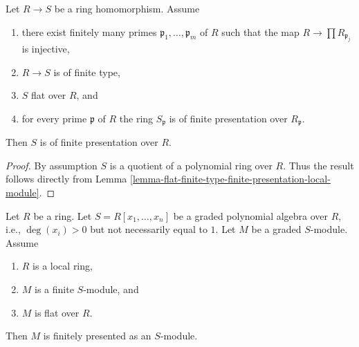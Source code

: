 \begin{lemma}
\label{lemma-flat-finite-type-finite-presentation-local}
Let $R \to S$ be a ring homomorphism.
Assume
\begin{enumerate}
\item there exist finitely many primes
$\mathfrak p_1, \ldots, \mathfrak p_m$ of $R$ such that
the map $R \to \prod R_{\mathfrak p_j}$ is injective,
\item $R \to S$ is of finite type,
\item $S$ flat over $R$, and
\item for every prime $\mathfrak p$ of $R$ the ring $S_{\mathfrak p}$
is of finite presentation over $R_{\mathfrak p}$.
\end{enumerate}
Then $S$ is of finite presentation over $R$.
\end{lemma}

\begin{proof}
By assumption $S$ is a quotient of a polynomial ring over $R$.
Thus the result follows directly from
Lemma \ref{lemma-flat-finite-type-finite-presentation-local-module}.
\end{proof}

\begin{lemma}
\label{lemma-flat-graded-finite-type-finite-presentation-module}
Let $R$ be a ring.
Let $S = R[x_1, \ldots, x_n]$ be a graded polynomial algebra over $R$,
i.e., $\deg(x_i) > 0$ but not necessarily equal to $1$.
Let $M$ be a graded $S$-module.
Assume
\begin{enumerate}
\item $R$ is a local ring,
\item $M$ is a finite $S$-module, and
\item $M$ is flat over $R$.
\end{enumerate}
Then $M$ is finitely presented as an $S$-module.
\end{lemma}

